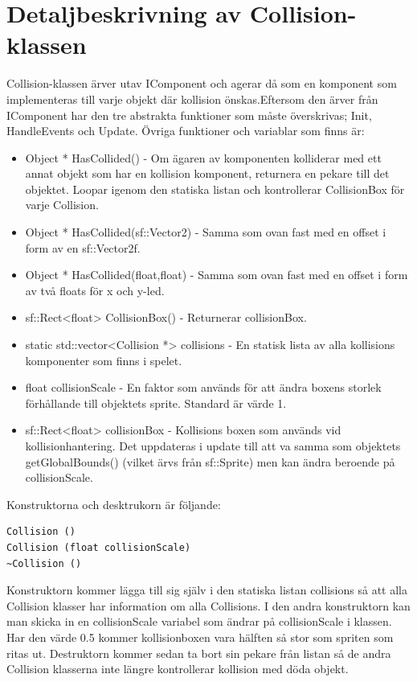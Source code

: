\documentclass{template}
\begin{document}
\section{Detaljbeskrivning av Collision-klassen}
Collision-klassen ärver utav IComponent och agerar då som en komponent som implementeras till varje objekt där kollision önskas.Eftersom den ärver från IComponent har den tre abstrakta funktioner som måste överskrivas; Init, HandleEvents och Update. Övriga funktioner och variablar som finns är:

\begin{itemize}
\item Object * HasCollided() - Om ägaren av komponenten kolliderar med ett annat objekt som har en kollision komponent, returnera en pekare till det objektet. Loopar igenom den statiska listan och kontrollerar CollisionBox för varje Collision. 

\item Object * HasCollided(sf::Vector2) - Samma som ovan fast med en offset i form av en sf::Vector2f.

\item Object * HasCollided(float,float) - Samma som ovan fast med en offset i form av två floats för x och y-led.

\item sf::Rect<float> CollisionBox() - Returnerar collisionBox.

\item static std::vector<Collision *> collisions - En statisk lista av alla kollisions komponenter som finns i spelet.

\item float collisionScale - En faktor som används för att ändra boxens storlek förhållande till objektets sprite. Standard är värde 1.

\item sf::Rect<float> collisionBox - Kollisions boxen som används vid kollisionhantering. Det uppdateras i update till att va samma som objektets getGlobalBounds() (vilket ärvs från sf::Sprite) men kan ändra beroende på collisionScale.
\end{itemize}

{\setlength{\parindent}{0cm}
Konstruktorna och desktrukorn är följande:
}

\begin{verbatim}
Collision ()
Collision (float collisionScale)
~Collision ()
\end{verbatim}
Konstruktorn kommer lägga till sig själv i den statiska listan collisions så att alla Collision klasser har information om alla Collisions. I den andra konstruktorn kan man skicka in en collisionScale variabel som ändrar på collisionScale i klassen. Har den värde 0.5 kommer kollisionboxen vara hälften så stor som spriten som ritas ut. Destruktorn kommer sedan ta bort sin pekare från listan så de andra Collision klasserna inte längre kontrollerar kollision med döda objekt.
\end{document}
